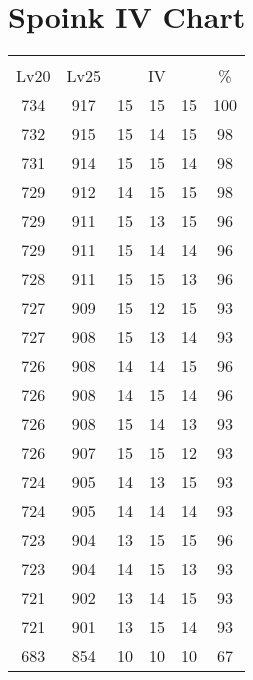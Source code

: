 \documentclass{article}%
\begin{document}
%
\normalsize%
\section{Spoink IV Chart}%
\label{sec:Spoink IV Chart}%
\renewcommand{\arraystretch}{1.5}%
\begin{tabular}{|c|c|c|c|c|c|}%
\hline%
\multicolumn{6}{|c|}{\textcolor{white}{ 
\linebreak{Spoink}
}%
\cellcolor{black}}\\%
\multicolumn{1}{|c}{Lv20}&\multicolumn{1}{c|}{Lv25}&\multicolumn{3}{c|}{IV}&\multicolumn{1}{|c|}{\%}\\%
\hline%
\rowcolor{color100}%
734&917&15&15&15&100\\%
\hline%
\rowcolor{color98}%
732&915&15&14&15&98\\%
\hline%
\rowcolor{color98}%
731&914&15&15&14&98\\%
\hline%
\rowcolor{color98}%
729&912&14&15&15&98\\%
\hline%
\rowcolor{color96}%
729&911&15&13&15&96\\%
\hline%
\rowcolor{color96}%
729&911&15&14&14&96\\%
\hline%
\rowcolor{color96}%
728&911&15&15&13&96\\%
\hline%
\rowcolor{color93}%
727&909&15&12&15&93\\%
\hline%
\rowcolor{color93}%
727&908&15&13&14&93\\%
\hline%
\rowcolor{color96}%
726&908&14&14&15&96\\%
\hline%
\rowcolor{color96}%
726&908&14&15&14&96\\%
\hline%
\rowcolor{color93}%
726&908&15&14&13&93\\%
\hline%
\rowcolor{color93}%
726&907&15&15&12&93\\%
\hline%
\rowcolor{color93}%
724&905&14&13&15&93\\%
\hline%
\rowcolor{color93}%
724&905&14&14&14&93\\%
\hline%
\rowcolor{color96}%
723&904&13&15&15&96\\%
\hline%
\rowcolor{color93}%
723&904&14&15&13&93\\%
\hline%
\rowcolor{color93}%
721&902&13&14&15&93\\%
\hline%
\rowcolor{color93}%
721&901&13&15&14&93\\%
\hline%
\rowcolor{color91}%
683&854&10&10&10&67\\%
\end{tabular}

%
\end{document}
